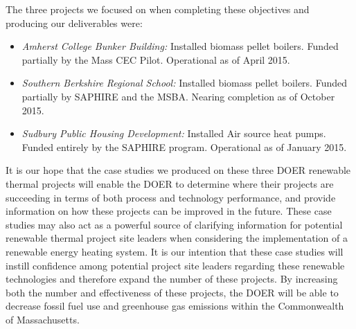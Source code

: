 \noindent
The three projects we focused on when completing these objectives and producing our deliverables were:
\begin{itemize}
  \item{\emph{Amherst College Bunker Building:} Installed biomass pellet boilers. Funded partially by the Mass CEC Pilot. Operational as of April 2015.}
  \item{\emph{Southern Berkshire Regional School:} Installed biomass pellet boilers. Funded partially by SAPHIRE and the MSBA. Nearing completion as of October 2015.}
  \item{\emph{Sudbury Public Housing Development:} Installed Air source heat pumps. Funded entirely by the SAPHIRE program. Operational as of January 2015.}
\end{itemize}
\par It is our hope that the case studies we produced on these three DOER renewable thermal projects will enable the DOER to determine where their projects are succeeding in terms of both process and technology performance, and provide information on how these projects can be improved in the future. These case studies may also act as a powerful source of clarifying information for potential renewable thermal project site leaders when considering the implementation of a renewable energy heating system. It is our intention that these case studies will instill confidence among potential project site leaders regarding these renewable technologies and therefore expand the number of these projects. By increasing both the number and effectiveness of these projects, the DOER will be able to decrease fossil fuel use and greenhouse gas emissions within the Commonwealth of Massachusetts.

